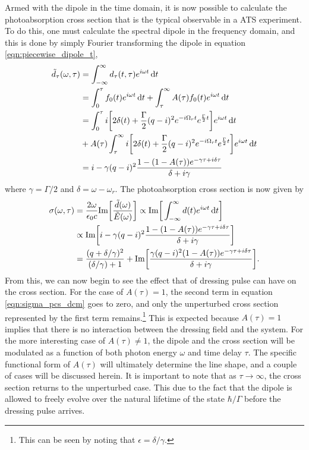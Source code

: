 Armed with the dipole in the time domain, it is now possible to calculate the photoabsorption cross section that is the typical observable in a ATS experiment.  To do this, one must calculate the spectral dipole in the frequency domain, and this is done by simply Fourier transforming the dipole in equation \ref{eqn:piecewise_dipole_t},
\begin{equation}
	\begin{aligned}
	\tilde{d}_\tau(\omega,\tau)&=\int_{-\infty}^{\infty} d_\tau(t,\tau)e^{i\omega t}\mathop{}\!\mathrm{d} t\\
	&=\int_0^\tau f_0(t)e^{i\omega t}\mathop{}\!\mathrm{d} t + \int_\tau^\infty A(\tau)f_0(t)e^{i\omega t}\mathop{}\!\mathrm{d} t\\
	&=\int_0^\tau i\bigg[ 2\delta(t) + \frac{\Gamma}{2}(q-i)^2 e^{-i\Omega_r t}e^{\frac{\Gamma}{2}t} \bigg]e^{i\omega t}\mathop{}\!\mathrm{d} t \\ & + A(\tau)\int_\tau^\infty i\bigg[ 2\delta(t) + \frac{\Gamma}{2}(q-i)^2 e^{-i\Omega_r t}e^{\frac{\Gamma}{2}t} \bigg]e^{i\omega t}\mathop{}\!\mathrm{d} t\\
	&=i-\gamma(q-i)^2\frac{1-(1-A(\tau))e^{-\gamma\tau +i\delta\tau}}{\delta+i\gamma}
	\end{aligned}
\end{equation}
where $\gamma = \Gamma/2$ and $\delta=\omega-\omega_r$.  The photoabsorption cross section is now given by
\begin{equation}
\label{eqn:sigma_pcs_dcm}
	\begin{aligned}
	\sigma(\omega,\tau)&=\frac{2\omega}{\epsilon_0 c}\mathrm{Im}\bigg[\frac{\tilde{d}(\omega)}{\tilde{E}(\omega)}\bigg]\propto \mathrm{Im}\bigg[\int_{-\infty}^{\infty} d(t) e^{i\omega t} \mathop{}\!\mathrm{d} t\bigg]\\
	&\propto \mathrm{Im}\bigg[i-\gamma(q-i)^2\frac{1-(1-A(\tau))e^{-\gamma\tau +i\delta\tau}}{\delta+i\gamma}\bigg]\\
	&= \frac{(q+\delta/\gamma)^2}{(\delta/\gamma)+1} + \mathrm{Im}\bigg[\frac{\gamma(q-i)^2(1-A(\tau))e^{-\gamma\tau +i\delta\tau}}{\delta+i\gamma}\bigg].
	\end{aligned}
\end{equation} 
From this, we can now begin to see the effect that of dressing pulse can have on the cross section.  For the case of $A(\tau)=1$, the second term in equation \ref{eqn:sigma_pcs_dcm} goes to zero, and only the unperturbed cross section represented by the first term remains.\footnote{This can be seen by noting that $\epsilon=\delta/\gamma$.}  This is expected because $A(\tau)=1$ implies that there is no interaction between the dressing field and the system.  For the more interesting case of $A(\tau)\neq1$, the dipole and the cross section will be modulated as a function of both photon energy $\omega$ and time delay $\tau$.  The specific functional form of $A(\tau)$ will ultimately determine the line shape, and a couple of cases will be discussed herein.  It is important to note that as $\tau\rightarrow\infty$, the cross section returns to the unperturbed case. This due to the fact that the dipole is allowed to freely evolve over the natural lifetime of the state $\hbar/\Gamma$ before the dressing pulse arrives.


